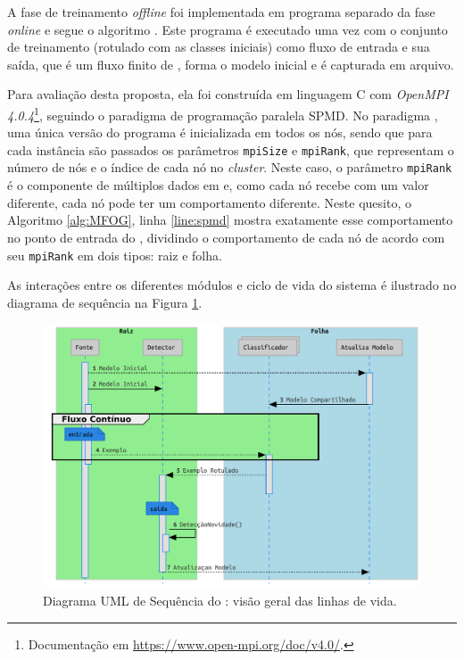 A fase de treinamento \emph{offline} foi implementada em programa separado da
fase \emph{online} e segue o algoritmo \minas \cite{Faria2016minas}.
Este programa é executado uma vez com o conjunto de treinamento (rotulado com as
classes iniciais) como fluxo de entrada e sua saída, que é um fluxo finito de
\mclusters, forma o modelo inicial e é capturada em arquivo.


Para avaliação desta proposta, ela foi construída em linguagem C com
\emph{OpenMPI 4.0.4}\footnote{Documentação em
\url{https://www.open-mpi.org/doc/v4.0/}.}, seguindo o paradigma de programação
paralela \acf{SPMD}.
No paradigma \spmd, uma única versão do programa é inicializada em todos os nós, sendo que
para cada instância são passados os parâmetros \texttt{mpiSize} e
\texttt{mpiRank}, que representam o número de nós e o índice de cada nó no
\emph{cluster}.
Neste caso, o parâmetro \texttt{mpiRank} é o componente de múltiplos dados em
\spmd e, como cada nó recebe com um valor diferente, cada nó pode ter um
comportamento diferente.
Neste quesito, o Algoritmo \ref{alg:MFOG}, linha \ref{line:spmd} mostra
exatamente esse comportamento no ponto de entrada do \mfog, dividindo o
comportamento de cada nó de acordo com seu \texttt{mpiRank} em dois tipos: raiz
e folha.

As interações entre os diferentes módulos e ciclo de vida do sistema é ilustrado
no diagrama de sequência na Figura \ref{fig:mfog-mpi-life}.

\begin{figure}[htb]
  \centerline{
    \includegraphics[width=0.80\linewidth,page=1]{figures/lifecycle-uml-svg.pdf}
  }
  \caption{Diagrama UML de Sequência do \mfog: visão geral das linhas de vida.}
  \label{fig:mfog-mpi-life}
\end{figure}

